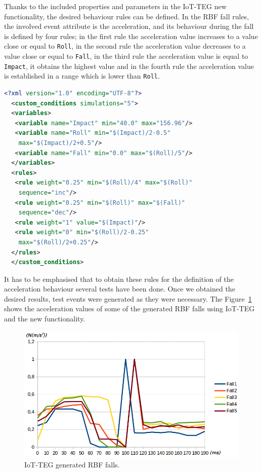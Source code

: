 \documentclass[journal]{IEEEtran}
\begin{document}
Thanks to the included properties and parameters in the IoT-TEG new functionality, the desired behaviour rules can
be defined. In the RBF fall rules, the involved event attribute is the acceleration, and its behaviour during the 
fall is defined by four rules; in the first rule the acceleration value increases to a value close or equal to \texttt{\small{Roll}},
in the second rule the acceleration value decreases to a value close or equal to \texttt{\small{Fall}}, in the third rule the 
acceleration value is equal to \texttt{\small{Impact}}, it obtains the highest value and in the fourth rule the acceleration value
is established in a range which is lower than \texttt{\small{Roll}}.

\begin{lstlisting}[basicstyle=\ttfamily\scriptsize,language=XML,caption={Rules to define a RBF fall},label=RBFFallRules]
  <?xml version="1.0" encoding="UTF-8"?>
  <custom_conditions simulations="5">
  <variables>
   <variable name="Impact" min="40.0" max="156.96"/>
   <variable name="Roll" min="$(Impact)/2-0.5" 
    max="$(Impact)/2+0.5"/>
   <variable name="Fall" min="0.0" max="$(Roll)/5"/>
  </variables>
  <rules>
   <rule weight="0.25" min="$(Roll)/4" max="$(Roll)" 
    sequence="inc"/>
   <rule weight="0.25" min="$(Roll)" max="$(Fall)" 
    sequence="dec"/>
   <rule weight="1" value="$(Impact)"/>
   <rule weight="0" min="$(Roll)/2-0.25" 
    max="$(Roll)/2+0.25"/>
  </rules>
  </custom_conditions>
\end{lstlisting}

It has to be emphasised that to obtain these rules for the definition
of the acceleration behaviour several tests
have been done. Once we obtained the desired results, test events were generated as they were necessary. The 
Figure~\ref{fig:IoTTEGRBFGeneratedEvents} shows the acceleration values of some of the generated RBF falls using
IoT-TEG and the new functionality.

\begin{figure}[!ht]
  \centering
  \includegraphics[scale=0.25]{img/IoTTEGRBFGeneratedEvents}
  \caption[IoT-TEG generated RBF falls]{IoT-TEG generated RBF falls.}
  \label{fig:IoTTEGRBFGeneratedEvents}
\end{figure}
\end{document}
